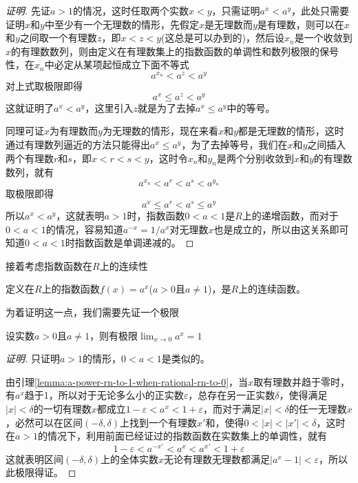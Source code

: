 \begin{proof}[证明]
  先证$a>1$的情况，这时任取两个实数$x<y$，只需证明$a^x<a^y$，此处只需要证明$x$和$y$中至少有一个无理数的情形，先假定$x$是无理数而$y$是有理数，则可以在$x$和$y$之间取一个有理数$z$，即$x<z<y$(这总是可以办到的)，然后设$x_n$是一个收敛到$x$的有理数数列，则由定义在有理数集上的指数函数的单调性和数列极限的保号性，在$x_n$中必定从某项起恒成立下面不等式
  \[ a^{x_n}<a^z<a^y \]
  对上式取极限即得
  \[ a^x \leqslant a^z < a^y \]
  这就证明了$a^x<a^y$，这里引入$z$就是为了去掉$a^x \leqslant a^y$中的等号。

  同理可证$x$为有理数而$y$为无理数的情形，现在来看$x$和$y$都是无理数的情形，这时通过有理数列逼近的方法只能得出$a^x \leqslant a^y$，为了去掉等号，我们在$x$和$y$之间插入两个有理数$r$和$s$，即$x<r<s<y$，这时令$x_n$和$y_n$是两个分别收敛到$x$和$y$的有理数数列，就有
  \[ a^{x_n} < a^r < a^s < a^{y_n} \]
  取极限即得
  \[ a^x \leqslant a^r < a^s \leqslant a^y \]
所以$a^x < a^y$，这就表明$a>1$时，指数函数$0<a<1$是$R$上的递增函数，而对于$0<a<1$的情况，容易知道$a^{-x}=1/a^x$对无理数$x$也是成立的，所以由这关系即可知道$0<a<1$时指数函数是单调递减的。
\end{proof}

接着考虑指数函数在$R$上的连续性
\begin{theorem}
  定义在$R$上的指数函数$f(x)=a^x$($a>0$且$a \neq 1$)，是$R$上的连续函数。
\end{theorem}

为着证明这一点，我们需要先证一个极限
\begin{lemma}
  \label{lemma:a-power-x-to-1-when-real-x-to-0}
  设实数$a>0$且$a \neq 1$，则有极限$\lim_{x \to 0} a^x = 1$
\end{lemma}

\begin{proof}[证明]
  只证明$a>1$的情形，$0<a<1$是类似的。

  由引理\autoref{lemma:a-power-rn-to-1-when-rational-rn-to-0}，当$x$取有理数并趋于零时，有$a^x$趋于1，所以对于无论多么小的正实数$\varepsilon$，总存在另一正实数$\delta$，使得满足$|x|<\delta$的一切有理数$x$都成立$1-\varepsilon<a^x<1+\varepsilon$，而对于满足$|x|<\delta$的任一无理数$x$，必然可以在区间$(-\delta,\delta)$上找到一个有理数$x'$和，使得$0<|x|<|x'|<\delta$，这时在$a>1$的情况下，利用前面已经证过的指数函数在实数集上的单调性，就有
  \[ 1-\varepsilon < a^{-x'}<a^x<a^{x'} < 1+\varepsilon \]
  这就表明区间$(-\delta,\delta)$上的全体实数$x$无论有理数无理数都满足$|a^x-1|<\varepsilon$，所以此极限得证。
\end{proof}

